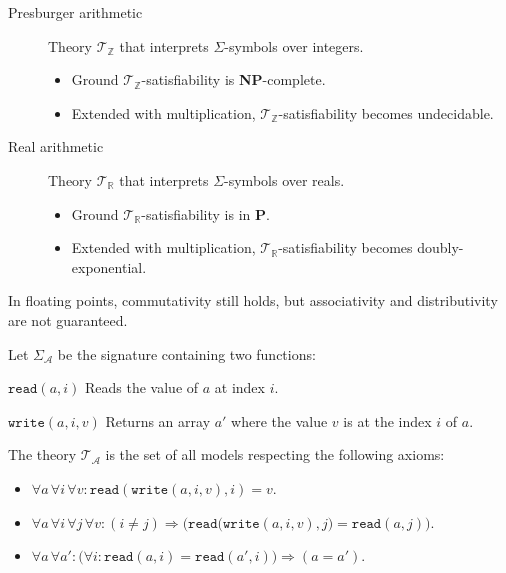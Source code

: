\begin{description}
        \begin{description}
            \item[Presburger arithmetic]
                Theory $\mathcal{T}_\mathbb{Z}$ that interprets $\Sigma$-symbols over integers.
                \begin{itemize}
                    \item Ground $\mathcal{T}_\mathbb{Z}$-satisfiability is \textbf{NP}-complete.
                    \item Extended with multiplication, $\mathcal{T}_\mathbb{Z}$-satisfiability becomes undecidable.
                \end{itemize}
            \item[Real arithmetic]
                Theory $\mathcal{T}_\mathbb{R}$ that interprets $\Sigma$-symbols over reals.
                \begin{itemize}
                    \item Ground $\mathcal{T}_\mathbb{R}$-satisfiability is in \textbf{P}.
                    \item Extended with multiplication, $\mathcal{T}_\mathbb{R}$-satisfiability becomes doubly-exponential.
                \end{itemize}
        \end{description}
        
        \begin{remark}
            In floating points, commutativity still holds, but associativity and distributivity are not guaranteed.
        \end{remark}


    \item[Array theory] 
        Let $\Sigma_\mathcal{A}$ be the signature containing two functions:
        \begin{descriptionlist}
            \item[$\texttt{read}(a, i)$] Reads the value of $a$ at index $i$.
            \item[$\texttt{write}(a, i, v)$] Returns an array $a'$ where the value $v$ is at the index $i$ of $a$.
        \end{descriptionlist}
        
        The theory $\mathcal{T}_\mathcal{A}$ is the set of all models respecting the following axioms:
        \begin{itemize}
            \item $\forall a\, \forall i\, \forall v: \texttt{read}(\texttt{write}(a, i, v), i) = v$.
            \item $\forall a\, \forall i\, \forall j\, \forall v: (i \neq j) \Rightarrow \Big( \texttt{read}\big( \texttt{write}(a,i,v), j \big) = \texttt{read}(a, j) \Big)$.
            \item $\forall a\, \forall a': \big( \forall i: \texttt{read}(a, i) = \texttt{read}(a', i) \big) \Rightarrow (a = a')$.
        \end{itemize}
        

\end{description}

